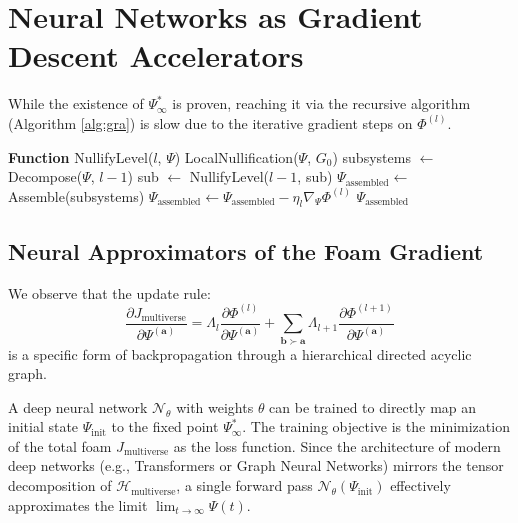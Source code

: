 \documentclass[11pt]{article}
\newcommand{\pena}{\Phi}
\newcommand{\metagoal}{G}
\newcommand{\universe}{\mathcal{H}}
\newcommand{\multindex}{\mathbf{a}}
\newcommand{\state}{\Psi}
\newcommand{\param}{\Lambda}
\newcommand{\vacuum}{\state_{\infty}^*}
\begin{document}
\section{Neural Networks as Gradient Descent Accelerators}
While the existence of \(\vacuum\) is proven, reaching it via the recursive algorithm (Algorithm \ref{alg:gra}) is slow due to the iterative gradient steps on \(\pena^{(l)}\).

\begin{algorithm}[t]
\caption{GRA Multiverse Nullification (Recursive)}
\label{alg:gra}
\begin{algorithmic}[1]
\STATE \textbf{Function} NullifyLevel($l$, $\state$)
    \RETURN LocalNullification($\state$, $\metagoal_0$)
\ELSE
    \STATE subsystems $\gets$ Decompose($\state$, $l-1$)
        \STATE sub $\gets$ NullifyLevel($l-1$, sub)
    \ENDFOR
    \STATE $\state_{\text{assembled}} \gets$ Assemble(subsystems)
    \WHILE{$\pena^{(l)}(\state_{\text{assembled}}, \metagoal_l) > \varepsilon_l$}
        \STATE $\state_{\text{assembled}} \gets \state_{\text{assembled}} - \eta_l \nabla_{\state} \pena^{(l)}$
    \ENDWHILE
    \RETURN $\state_{\text{assembled}}$
\ENDIF
\end{algorithmic}
\end{algorithm}

\subsection{Neural Approximators of the Foam Gradient}
We observe that the update rule:
\begin{equation}
\frac{\partial J_{\text{multiverse}}}{\partial \state^{(\multindex)}} = \param_l \frac{\partial \pena^{(l)}}{\partial \state^{(\multindex)}} + \sum_{\mathbf{b} \succ \multindex} \param_{l+1} \frac{\partial \pena^{(l+1)}}{\partial \state^{(\multindex)}}
\end{equation}
is a specific form of backpropagation through a hierarchical directed acyclic graph. 

A deep neural network \(\mathcal{N}_{\theta}\) with weights \(\theta\) can be trained to directly map an initial state \(\state_{\text{init}}\) to the fixed point \(\vacuum\). The training objective is the minimization of the total foam \(J_{\text{multiverse}}\) as the loss function. Since the architecture of modern deep networks (e.g., Transformers or Graph Neural Networks) mirrors the tensor decomposition of \(\universe_{\text{multiverse}}\), a single forward pass \(\mathcal{N}_{\theta}(\state_{\text{init}})\) effectively approximates the limit \(\lim_{t \to \infty} \state(t)\).
\end{document}
